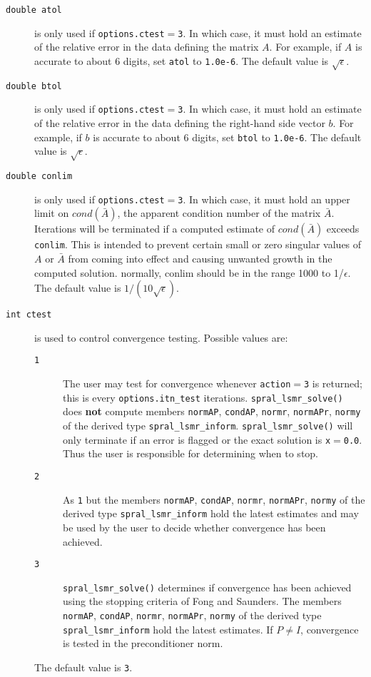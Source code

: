 \begin{description}

\item[\texttt{double atol}] is only used if
   {\tt options.ctest}$ =${\tt 3}.
   In which case, it must hold an estimate of the relative error in the data
   defining the matrix $A$.  For example, if $A$ is accurate to about 6 digits,
   set {\tt atol} to {\tt 1.0e-6}. The default value is $\sqrt{\epsilon}$.

\item[\texttt{double btol}] is only used if
   {\tt options.ctest}$ =${\tt 3}.
   In which case, it must hold an estimate of the relative error in the data
   defining the right-hand side vector $b$.  For example, if $b$ is
   accurate to about 6 digits, set {\tt btol} to {\tt 1.0e-6}. The default value
   is $\sqrt{\epsilon}$.


\item[\texttt{double conlim}] is only used if
   {\tt options.ctest}$ =${\tt 3}.
   In which case, it must hold an upper limit on $cond(\bar{A})$, the apparent
   condition number of the matrix $\bar{A}$. Iterations will be terminated 
   if a computed estimate of $cond(\bar{A})$ exceeds {\tt conlim}.
   This is intended to prevent certain small or
   zero singular values of $A$ or $\bar{A}$ from
   coming into effect and causing unwanted growth in the computed solution.
   normally, conlim should be in the range 1000 to 1/$\epsilon$.
   The default value is $1/(10\sqrt{\epsilon})$.

\item[\texttt{int ctest}] is used to control
   convergence testing. Possible values are:
   \begin{description}
   \item[\texttt{1}] The user may test for convergence whenever 
      {\tt action}$ = ${\tt 3} is returned; this is
      every {\tt options.itn\_test} iterations.
      {\tt spral\_lsmr\_solve()} does {\bf not} compute members
      {\tt normAP}, {\tt condAP}, {\tt normr}, {\tt normAPr}, {\tt normy}
      of the derived type {\tt spral\_lsmr\_inform}.
      {\tt spral\_lsmr\_solve()} will only terminate if an  error is flagged
      or the exact solution is {\tt x}$ = ${\tt 0.0}.
      Thus the user is responsible for determining when to stop.
   \item[\texttt{2}] As {\texttt 1} but the members
      {\tt normAP}, {\tt condAP}, {\tt normr}, {\tt normAPr}, {\tt normy}
      of the derived type {\tt spral\_lsmr\_inform} hold the latest estimates and
      may be used by the user to decide whether convergence has been achieved.
   \item[\texttt{3}] {\tt spral\_lsmr\_solve()} determines if convergence has been achieved
      using the stopping criteria of Fong and Saunders. The members
      {\tt normAP}, {\tt condAP}, {\tt normr}, {\tt normAPr}, {\tt normy}
      of the derived type {\tt spral\_lsmr\_inform} hold the latest estimates.
      If $P \neq I$,  convergence is tested in the
      preconditioner norm.
   \end{description}
   The default value is {\tt 3}.


\end{description}

